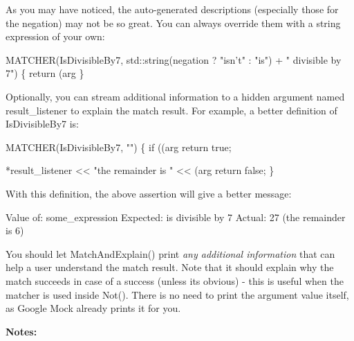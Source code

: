 As you may have noticed, the auto-\/generated descriptions (especially those for the negation) may not be so great. You can always override them with a string expression of your own\+: 
\begin{DoxyCode}
MATCHER(IsDivisibleBy7, std::string(negation ? \textcolor{stringliteral}{"isn't"} : \textcolor{stringliteral}{"is"}) +
                        \textcolor{stringliteral}{" divisible by 7"}) \{
  \textcolor{keywordflow}{return} (arg %
\}
\end{DoxyCode}


Optionally, you can stream additional information to a hidden argument named {\ttfamily result\+\_\+listener} to explain the match result. For example, a better definition of {\ttfamily Is\+Divisible\+By7} is\+: 
\begin{DoxyCode}
MATCHER(IsDivisibleBy7, \textcolor{stringliteral}{""}) \{
  \textcolor{keywordflow}{if} ((arg %
    \textcolor{keywordflow}{return} \textcolor{keyword}{true};

  *result\_listener << \textcolor{stringliteral}{"the remainder is "} << (arg %
  \textcolor{keywordflow}{return} \textcolor{keyword}{false};
\}
\end{DoxyCode}


With this definition, the above assertion will give a better message\+: 
\begin{DoxyCode}
Value of: some\_expression
Expected: is divisible by 7
  Actual: 27 (the remainder is 6)
\end{DoxyCode}


You should let {\ttfamily Match\+And\+Explain()} print {\itshape any additional information} that can help a user understand the match result. Note that it should explain why the match succeeds in case of a success (unless it\textquotesingle{}s obvious) -\/ this is useful when the matcher is used inside {\ttfamily Not()}. There is no need to print the argument value itself, as Google Mock already prints it for you.

{\bfseries Notes\+:}


